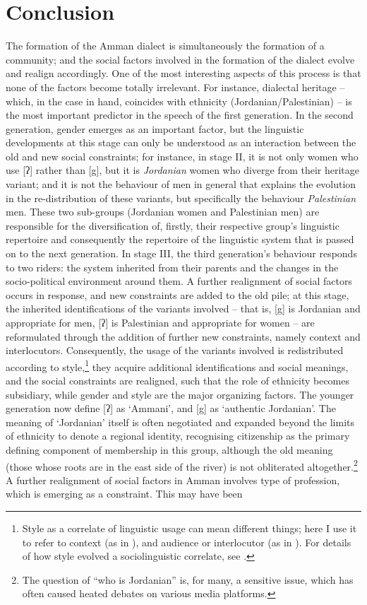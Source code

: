 \documentclass[output=paper]{langsci/langscibook}
\begin{document}
\section{Conclusion}

The formation of the Amman dialect is simultaneously the formation of a community; and the social factors involved in the formation of the dialect evolve and realign accordingly. One of the most interesting aspects of this process is that none of the factors become totally irrelevant. For instance, dialectal heritage – which, in the case in hand, coincides with ethnicity (Jordanian/Palestinian) – is the most important predictor in the speech of the first generation. In the second generation, gender emerges as an important factor, but the linguistic developments at this stage can only be understood as an interaction between the old and new social constraints; for instance, in stage II, it is not only women who use [ʔ] rather than [g], but it is \textit{Jordanian} women who diverge from their heritage variant; and it is not the behaviour of men in general that explains the evolution in the re-distribution of these variants, but specifically the behaviour \textit{Palestinian} men. These two sub-groups (Jordanian women and Palestinian men) are responsible for the diversification of, firstly, their respective group’s linguistic repertoire and consequently the repertoire of the linguistic system that is passed on to the next generation. In stage III, the third generation’s behaviour responds to two riders: the system inherited from their parents and the changes in the socio-political environment around them. A further realignment of social factors occurs in response, and new constraints are added to the old pile; at this stage, the inherited identifications of the variants involved – that is, [g] is Jordanian and appropriate for men, [ʔ] is Palestinian and appropriate for women – are reformulated through the addition of further new constraints, namely context and interlocutors. Consequently, the usage of the variants involved is redistributed according to style,\footnote{Style as a correlate of linguistic usage can mean different things; here I use it to refer to context (as in \citealt{Labov1972}), and audience or interlocutor (as in \citealt{Bell1984}). For details of how style evolved a sociolinguistic correlate, see \citet{EckertRickford2001}.} they acquire additional identifications and social meanings, and the social constraints are realigned, such that the role of ethnicity becomes subsidiary, while gender and style are the major organizing factors. The younger generation now define [ʔ] as ‘Ammani’, and [g] as ‘authentic Jordanian’. The meaning of ‘Jordanian’ itself is often negotiated and expanded beyond the limits of ethnicity to denote a regional identity, recognising citizenship as the primary defining component of membership in this group, although the old meaning (those whose roots are in the east side of the river) is not obliterated altogether.\footnote{The question of “who is Jordanian” is, for many, a sensitive issue, which has often caused heated debates on various media platforms.} A further realignment of social factors in Amman involves type of profession, which is emerging as a constraint. This may have been 
\end{document}
